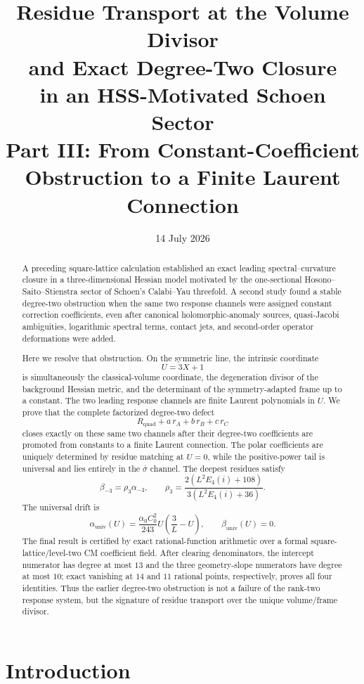 \documentclass[11pt]{article}
\title{\textbf{Residue Transport at the Volume Divisor\\and Exact Degree-Two Closure\\in an HSS-Motivated Schoen Sector}\\[2mm]
\large Part III: From Constant-Coefficient Obstruction to a Finite Laurent Connection}
\author{}
\date{14 July 2026}
\theoremstyle{definition}
\theoremstyle{remark}
\newcommand{\bsigma}{\overline{\sigma}}
\begin{document}
\maketitle

\begin{abstract}
A preceding square-lattice calculation established an exact leading spectral--curvature closure in a three-dimensional Hessian model motivated by the one-sectional Hosono--Saito--Stienstra sector of Schoen's Calabi--Yau threefold.  A second study found a stable degree-two obstruction when the same two response channels were assigned constant correction coefficients, even after canonical holomorphic-anomaly sources, quasi-Jacobi ambiguities, logarithmic spectral terms, contact jets, and second-order operator deformations were added.

Here we resolve that obstruction.  On the symmetric line, the intrinsic coordinate
\[
 U=3X+1
\]
is simultaneously the classical-volume coordinate, the degeneration divisor of the background Hessian metric, and the determinant of the symmetry-adapted frame up to a constant.  The two leading response channels are finite Laurent polynomials in $U$.  We prove that the complete factorized degree-two defect
\[
 R_{\mathrm{quad}}+a\,r_A+b\,r_B+c\,r_C
\]
closes exactly on these same two channels after their degree-two coefficients are promoted from constants to a finite Laurent connection.  The polar coefficients are uniquely determined by residue matching at $U=0$, while the positive-power tail is universal and lies entirely in the $\bsigma$ channel.  The deepest residues satisfy
\[
 \beta_{-3}=\rho_3\alpha_{-3},
 \qquad
 \rho_3=\frac{2(L^2E_4(i)+108)}{3(L^2E_4(i)+36)}.
\]
The universal drift is
\[
 \alpha_{\mathrm{univ}}(U)
 =\frac{\alpha_0C_0^2}{243}U\left(\frac3L-U\right),
 \qquad
 \beta_{\mathrm{univ}}(U)=0.
\]
The final result is certified by exact rational-function arithmetic over a formal square-lattice/level-two CM coefficient field.  After clearing denominators, the intercept numerator has degree at most $13$ and the three geometry-slope numerators have degree at most $10$; exact vanishing at $14$ and $11$ rational points, respectively, proves all four identities.  Thus the earlier degree-two obstruction is not a failure of the rank-two response system, but the signature of residue transport over the unique volume/frame divisor.
\end{abstract}

\section{Introduction}
\end{document}
